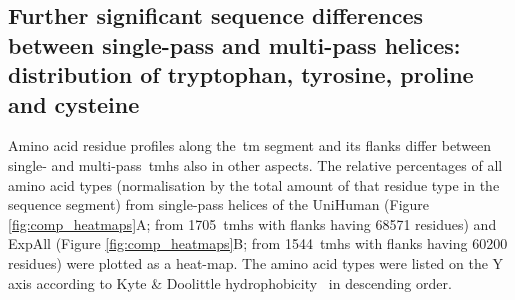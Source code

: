\subsection{Further significant sequence differences between single-pass and multi-pass helices: distribution of tryptophan, tyrosine, proline and cysteine}

Amino acid residue profiles along the~\gls{tm} segment and its flanks differ between single- and multi-pass~\gls{tmh}s also in other aspects.
The relative percentages of all amino acid types (normalisation by the total amount of that residue type in the sequence segment) from single-pass helices of the UniHuman (Figure \ref{fig:comp_heatmaps}A; from 1705~\gls{tmh}s with flanks having 68571 residues) and ExpAll (Figure \ref{fig:comp_heatmaps}B; from 1544~\gls{tmh}s with flanks having 60200 residues) were plotted as a heat-map.
The amino acid types were listed on the Y axis according to Kyte \& Doolittle hydrophobicity~\cite{Kyte1982} in descending order.

